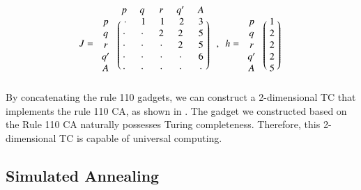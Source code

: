 \documentclass[twocolumn,superscriptaddress,english,showpacs,longbibliography]{revtex4-2}
\newcommand{\jinguo}[1]{[{\color{blue}{JGL: #1}}]}
\newcommand{\ym}[1]{[{\color{red}{YM: #1}}]}
\begin{document}
\begin{equation}
J = \begin{blockarray}{cccccc}
& p & q & r & q^\prime & A\\
\begin{block}{c(ccccc)}
p & ~\cdot~ & ~1~ & ~1~ & ~2~ & ~3~\\
q & \cdot & \cdot & 2 & 2 & 5\\
r & \cdot & \cdot & \cdot & 2 & 5\\
q^\prime & \cdot & \cdot & \cdot & \cdot & 6\\
A & \cdot & \cdot & \cdot & \cdot & \cdot\\
\end{block}
\end{blockarray}
~~, ~~h = \begin{blockarray}{cc}
& \phantom{x} \\
\begin{block}{c(c)}
p & ~1~\\
q & 2\\
r & 2\\
q^\prime & 2\\
A & 5\\
\end{block}
\end{blockarray}
\end{equation}
By concatenating the rule 110 gadgets, we can construct a 2-dimensional TC that implements the rule 110 CA, as shown in .
The gadget we constructed based on the Rule 110 CA naturally possesses Turing completeness. Therefore, this 2-dimensional TC is capable of universal computing.

\subsection{Simulated Annealing}\label{simulated-annealing-algorithm}
\end{document}
